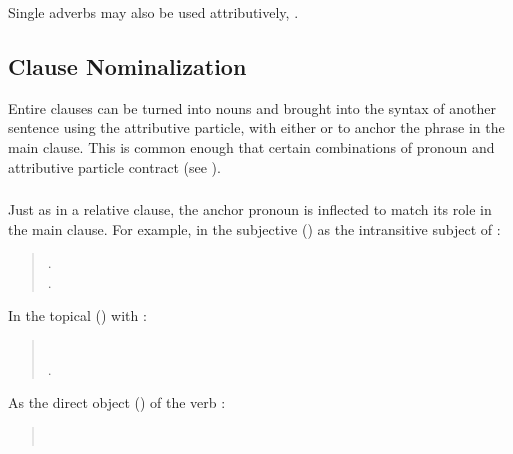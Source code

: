 \subsubsection{} Single adverbs may also be used attributively,
 .


\subsection{Clause Nominalization} Entire clauses can be turned into
nouns and brought into the syntax of another sentence using the
attributive particle, with either  or  to anchor the
phrase in the main clause.  This is common enough that certain
combinations of pronoun and attributive particle contract (see
). \label{syn:clause-nom}

\subsubsection{} Just as in a relative clause, the anchor pronoun is
inflected to match its role in the main clause.  For example, in the
subjective () as the intransitive subject of :

\begin{quotation}
\noindent{}.\\
\indent{}.
\end{quotation}

\noindent In the topical () with :
\begin{quotation}
\noindent{}\\
\indent{}.
\end{quotation}

\noindent As the direct object () of the verb :
\begin{quotation}
\noindent{}\\
\indent{}
\end{quotation}

